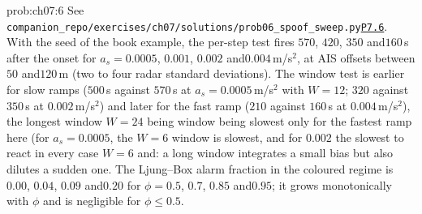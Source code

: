 \documentclass[graybox,envcountchap]{style/SNmono}
\newcommand{\repopath}[1]{\texttt{#1}}
\providecommand{\DIFadd}[1]{{\protect\color{blue} #1}} %
\providecommand{\DIFdel}[1]{{\protect\color{red} #1}} %
\providecommand{\DIFaddbegin}{} %
\providecommand{\DIFaddend}{} %
\providecommand{\DIFdelbegin}{} %
\providecommand{\DIFdelend}{} %
\DeclareRobustCommand{\RtwoDel}[1]{{\color{red}%
  \renewcommand{\DIFadd}[1]{##1}\renewcommand{\DIFdel}[1]{##1}%
  #1}}
\DeclareRobustCommand{\RtwoAdd}[1]{{\color{blue}#1}}
\DeclareRobustCommand{\codeentry}[1]{\hyperref[code:#1]{\texttt{#1}}}
\begin{document}
\begin{sol}{prob:ch07:6}
See \RtwoDel{\repopath{companion\_\allowbreak repo/\allowbreak exercises/\allowbreak ch07/\allowbreak solutions/\allowbreak prob06\_\allowbreak spoof\_\allowbreak sweep.py}}\RtwoAdd{\codeentry{P7.6}}. With the seed of the book example, the per-step test fires $570$, $420$, $350$ and\DIFaddbegin \allowbreak \DIFaddend $160$\,s after the onset for $a_s=0.0005$, $0.001$, $0.002$ and\DIFaddbegin \allowbreak \DIFaddend $0.004$\,m/s$^{2}$, at AIS offsets between $50$ and\DIFaddbegin \allowbreak \DIFaddend $120$\,m (two to four radar standard deviations). The window test is earlier for slow ramps ($500$\,s against $570$\,s at $a_s=0.0005$\,m/s$^{2}$ with $W=12$; $320$ against $350$\,s at $0.002$\,m/s$^{2}$) and later for the fast ramp ($210$ against $160$\,s at $0.004$\,m/s$^{2}$), the \DIFdelbegin \DIFdel{longest window }\DIFdelend $W=24$ \DIFdelbegin \DIFdel{being }\DIFdelend \DIFaddbegin \DIFadd{window being slowest only for the fastest ramp here (for $a_s=0.0005$, the $W=6$ window is slowest, and for $0.002$ }\DIFaddend the \DIFdelbegin \DIFdel{slowest to react in every case}\DIFdelend \DIFaddbegin \DIFadd{$W=6$ and}\allowbreak \DIFadd{$24$ windows tie)}\DIFaddend : a long window integrates a small bias but also dilutes a sudden one. The Ljung--Box alarm fraction in the coloured regime is $0.00$, $0.04$, $0.09$ and\DIFaddbegin \allowbreak \DIFaddend $0.20$ for $\phi=0.5$, $0.7$, $0.85$ and\DIFaddbegin \allowbreak \DIFaddend $0.95$; it grows monotonically with $\phi$ and is negligible for $\phi\le0.5$.
\end{sol}
\end{document}
